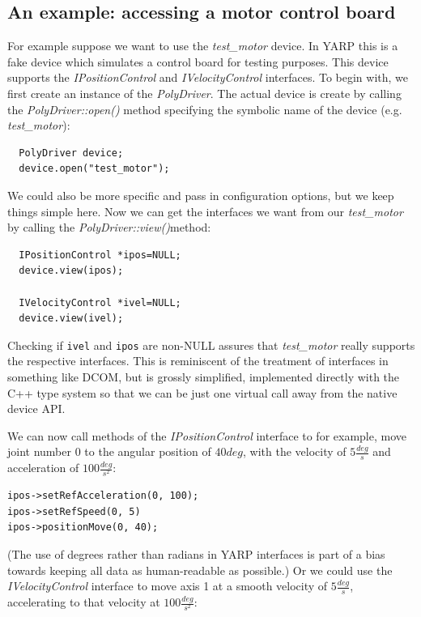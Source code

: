 \subsection{An example: accessing a motor control board}
For example suppose we want to use the \emph{test\_motor} device. In 
YARP this is a fake device which simulates a control board for
testing purposes. This device supports the \emph{IPositionControl} and 
\emph{IVelocityControl} interfaces. To begin with, we first create an 
instance of the \emph{PolyDriver}. The actual device is create by 
calling the \emph{PolyDriver::open()} method specifying the symbolic 
name of the device (e.g. \emph{test\_motor}):

\begin{verbatim}
  PolyDriver device;
  device.open("test_motor");
\end{verbatim}

We could also be more specific and pass in configuration options,
but we keep things simple here.
Now we can get the interfaces we want from our \emph{test\_motor} 
by calling the \emph{PolyDriver::view()}method:

\begin{verbatim}
  IPositionControl *ipos=NULL;
  device.view(ipos);

  IVelocityControl *ivel=NULL;
  device.view(ivel);
\end{verbatim}

Checking if {\tt ivel} and {\tt ipos} are non-NULL assures that 
\emph{test\_motor} really supports the respective interfaces.
This is reminiscent of the treatment of interfaces
in something like DCOM, but is grossly simplified,
implemented directly with the C++ type system so
that we can be just one virtual call away from
the native device API.

We can now call methods of the \emph{IPositionControl} interface to 
for example, move 
joint number $0$ to the angular position of $40deg$, with the velocity 
of $5\frac{deg}{s}$ and acceleration of $100\frac{deg}{s^2}$:

\begin{verbatim}
ipos->setRefAcceleration(0, 100);
ipos->setRefSpeed(0, 5)
ipos->positionMove(0, 40);
\end{verbatim}

%
(The use of degrees rather than radians in YARP interfaces
is part of a bias towards keeping all data as human-readable
as possible.)
%
Or we could use the \emph{IVelocityControl} interface to move axis 1
at a smooth velocity of $5\frac{deg}{s}$, accelerating to
that velocity at $100\frac{deg}{s^2}$:

